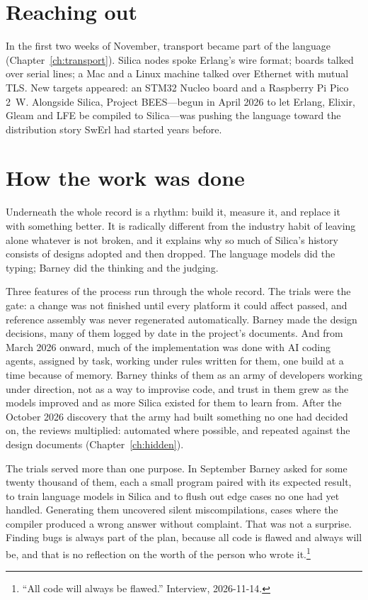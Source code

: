 \section{Reaching out}

In the first two weeks of November, transport became part of the language
(Chapter~\ref{ch:transport}). Silica nodes spoke Erlang's wire format; boards
talked over serial lines; a Mac and a Linux machine talked over Ethernet with
mutual TLS. New targets appeared: an STM32 Nucleo board and a Raspberry Pi Pico
2~W. Alongside Silica, Project BEES---begun in April 2026 to let Erlang, Elixir,
Gleam and LFE be compiled to Silica---was pushing the language toward the
distribution story SwErl had started years before.

\section{How the work was done}

Underneath the whole record is a rhythm: build it, measure it, and replace it
with something better. It is radically different from the industry habit of
leaving alone whatever is not broken, and it explains why so much of Silica's
history consists of designs adopted and then dropped. The language models did
the typing; Barney did the thinking and the judging.

Three features of the process run through the whole record. The trials were the
gate: a change was not finished until every platform it could affect passed,
and reference assembly was never regenerated automatically. Barney made the
design decisions, many of them logged by date in the project's documents. And
from March 2026 onward, much of the implementation was done with AI coding
agents, assigned by task, working under rules written for them, one build at a
time because of memory. Barney thinks of them as an army of developers working
under direction, not as a way to improvise code, and trust in them grew as the
models improved and as more Silica existed for them to learn from. After the
October 2026 discovery that the army had built something no one had decided on,
the reviews multiplied: automated where possible, and repeated against the
design documents (Chapter~\ref{ch:hidden}).

The trials served more than one purpose. In September Barney asked for some
twenty thousand of them, each a small program paired with its expected result,
to train language models in Silica and to flush out edge cases no one had yet
handled. Generating them uncovered silent miscompilations, cases where the
compiler produced a wrong answer without complaint. That was not a surprise.
Finding bugs is always part of the plan, because all code is flawed and always
will be, and that is no reflection on the worth of the person who wrote
it.\footnote{``All code will always be flawed.'' Interview, 2026-11-14.}
